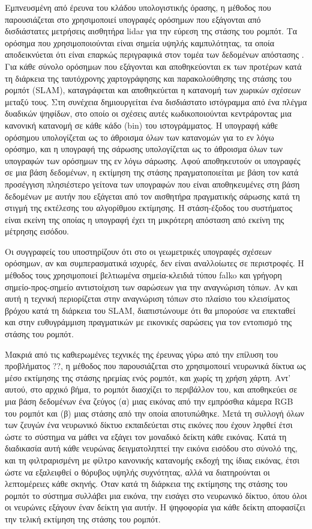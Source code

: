 Εμπνευσμένη από έρευνα του κλάδου υπολογιστικής όρασης, η μέθοδος που
παρουσιάζεται στο \cite{Himstedt2014} χρησιμοποιεί υπογραφές ορόσημων που
εξάγονται από δισδιάστατες μετρήσεις αισθητήρα lidar για την εύρεση της στάσης
του ρομπότ. Τα ορόσημα που χρησιμοποιούνται είναι σημεία υψηλής καμπυλότητας,
τα οποία αποδεικνύεται ότι είναι επαρκώς περιγραφικά στον τομέα των δεδομένων
απόστασης \cite{Tipaldi2010}. Για κάθε σύνολο ορόσημων που εξάγονται και
αποθηκεύονται εκ των προτέρων κατά τη διάρκεια της ταυτόχρονης χαρτογράφησης
και παρακολούθησης της στάσης του ρομπότ (SLAM), καταγράφεται και αποθηκεύεται η
κατανομή των χωρικών σχέσεων μεταξύ τους. Στη συνέχεια δημιουργείται ένα
δισδιάστατο ιστόγραμμα από ένα πλέγμα δυαδικών ψηφίδων, στο οποίο οι σχέσεις
αυτές κωδικοποιούνται κεντράροντας μια κανονική κατανομή σε κάθε κάδο (bin) του
ιστογράμματος. Η υπογραφή κάθε ορόσημου υπολογίζεται ως το άθροισμα όλων των
κατανομών για το εν λόγω ορόσημο, και η υπογραφή της σάρωσης υπολογίζεται
ως το άθροισμα όλων των υπογραφών των ορόσημων της εν λόγω σάρωσης.
Αφού αποθηκευτούν οι υπογραφές σε μια βάση δεδομένων, η εκτίμηση της στάσης
πραγματοποιείται με βάση τον κατά προσέγγιση πλησιέστερο γείτονα των υπογραφών
που είναι αποθηκευμένες στη βάση δεδομένων με αυτήν που εξάγεται από τον
αισθητήρα πραγματικής σάρωσης κατά τη στιγμή της εκτέλεσης του αλγορίθμου
εκτίμησης. Η στάση-έξοδος του συστήματος είναι εκείνη της οποίας η υπογραφή
έχει τη μικρότερη απόσταση από εκείνη της μέτρησης εισόδου.

Οι συγγραφείς του \cite{Kallasi2016} υποστηρίζουν ότι στο \cite{Himstedt2014} οι
γεωμετρικές υπογραφές σχέσεων ορόσημων, αν και συμπερασματικά ισχυρές, δεν
είναι αναλλοίωτες σε περιστροφές. Η μέθοδος τους χρησιμοποιεί βελτιωμένα
σημεία-κλειδιά τύπου falko και γρήγορη σημείο-προς-σημείο αντιστοίχιση των
σαρώσεων για την αναγνώριση τόπων. Αν και αυτή η τεχνική περιορίζεται στην
αναγνώριση τόπων στο πλαίσιο του κλεισίματος βρόχου κατά τη διάρκεια του SLAM,
διαπιστώνουμε ότι θα μπορούσε να επεκταθεί και στην ευθυγράμμιση πραγματικών με
εικονικές σαρώσεις για τον εντοπισμό της στάσης του ρομπότ.

Μακριά από τις καθιερωμένες τεχνικές της έρευνας γύρω από την επίλυση του
προβλήματος ??, η μέθοδος που παρουσιάζεται στο \cite{Lyrio2014} χρησιμοποιεί
νευρωνικά δίκτυα ως μέσο εκτίμησης της στάσης ηρεμίας ενός ρομπότ, και χωρίς τη
χρήση χάρτη. Αντ' αυτού, στο αρχικό βήμα, το ρομπότ διασχίζει το περιβάλλον
του, και αποθηκεύει σε μια βάση δεδομένων ένα ζεύγος (α) μιας εικόνας από την
εμπρόσθια κάμερα RGB του ρομπότ και (β) μιας στάσης από την οποία αποτυπώθηκε.
Μετά τη συλλογή όλων των ζευγών ένα νευρωνικό δίκτυο εκπαιδεύεται στις εικόνες
που έχουν ληφθεί έτσι ώστε το σύστημα να μάθει να εξάγει τον μοναδικό δείκτη
κάθε εικόνας. Κατά τη διαδικασία αυτή κάθε νευρώνας δειγματοληπτεί την εικόνα
εισόδου στο σύνολό της, και τη φιλτραρισμένη με φίλτρο κανονικής κατανομής
εκδοχή της ίδιας εικόνας, έτσι ώστε να εξαλειφθεί ο θόρυβος υψηλής συχνότητας,
αλλά να διατηρούνται οι λεπτομέρειες κάθε σκηνής.  Όταν κατά τη διάρκεια της
εκτίμησης της στάσης του ρομπότ το σύστημα συλλάβει μια εικόνα, την εισάγει στο
νευρωνικό δίκτυο, όπου όλοι οι νευρώνες εξάγουν έναν δείκτη για αυτήν. Η
ψηφοφορία για κάθε δείκτη αποφασίζει την τελική εκτίμηση της στάσης του ρομπότ.

